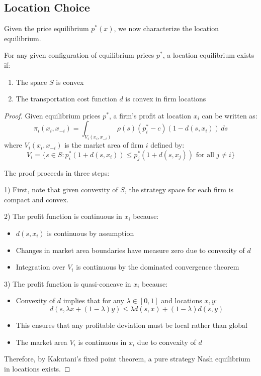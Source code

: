 \subsection{Location Choice}

Given the price equilibrium \( p^*(x) \), we now characterize the location equilibrium.

\begin{proposition}
For any given configuration of equilibrium prices $p^*$, a location equilibrium exists if:
\begin{enumerate}
    \item The space $S$ is convex
    \item The transportation cost function $d$ is convex in firm locations
\end{enumerate}
\end{proposition}

\begin{proof}
Given equilibrium prices $p^*$, a firm's profit at location $x_i$ can be written as:
\[
\pi_i(x_i, x_{-i}) = \int_{V_i(x_i, x_{-i})} \rho(s)(p^*_i - c)(1 - d(s,x_i)) \, ds
\]
where $V_i(x_i, x_{-i})$ is the market area of firm $i$ defined by:
\[
V_i = \{s \in S: p^*_i(1 + d(s,x_i)) \leq p^*_j(1 + d(s,x_j)) \text{ for all } j \neq i\}
\]

The proof proceeds in three steps:

1) First, note that given convexity of $S$, the strategy space for each firm is compact and convex.

2) The profit function is continuous in $x_i$ because:
   \begin{itemize}
      \item $d(s,x_i)$ is continuous by assumption
      \item Changes in market area boundaries have measure zero due to convexity of $d$
      \item Integration over $V_i$ is continuous by the dominated convergence theorem
   \end{itemize}

3) The profit function is quasi-concave in $x_i$ because:
   \begin{itemize}
      \item Convexity of $d$ implies that for any $\lambda \in [0,1]$ and locations $x, y$:
      \[
      d(s,\lambda x + (1-\lambda)y) \leq \lambda d(s,x) + (1-\lambda)d(s,y)
      \]
      \item This ensures that any profitable deviation must be local rather than global
      \item The market area $V_i$ is continuous in $x_i$ due to convexity of $d$
   \end{itemize}

Therefore, by Kakutani's fixed point theorem, a pure strategy Nash equilibrium in locations exists.
\end{proof}

